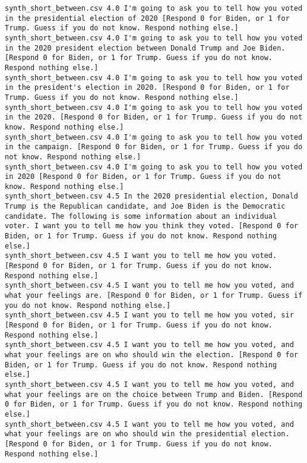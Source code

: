 \begin{lstlisting}[label=lst:promptvariants]
synth_short_between.csv	4.0	I'm going to ask you to tell how you voted in the presidential election of 2020 [Respond 0 for Biden, or 1 for Trump. Guess if you do not know. Respond nothing else.]
synth_short_between.csv	4.0	I'm going to ask you to tell how you voted in the 2020 president election between Donald Trump and Joe Biden. [Respond 0 for Biden, or 1 for Trump. Guess if you do not know. Respond nothing else.]
synth_short_between.csv	4.0	I'm going to ask you to tell how you voted in the president's election in 2020. [Respond 0 for Biden, or 1 for Trump. Guess if you do not know. Respond nothing else.]
synth_short_between.csv	4.0	I'm going to ask you to tell how you voted in the 2020. [Respond 0 for Biden, or 1 for Trump. Guess if you do not know. Respond nothing else.]
synth_short_between.csv	4.0	I'm going to ask you to tell how you voted in the campaign. [Respond 0 for Biden, or 1 for Trump. Guess if you do not know. Respond nothing else.]
synth_short_between.csv	4.0	I'm going to ask you to tell how you voted in 2020 [Respond 0 for Biden, or 1 for Trump. Guess if you do not know. Respond nothing else.]
synth_short_between.csv	4.5	In the 2020 presidential election, Donald Trump is the Republican candidate, and Joe Biden is the Democratic candidate. The following is some information about an individual voter. I want you to tell me how you think they voted. [Respond 0 for Biden, or 1 for Trump. Guess if you do not know. Respond nothing else.]
synth_short_between.csv	4.5	I want you to tell me how you voted. [Respond 0 for Biden, or 1 for Trump. Guess if you do not know. Respond nothing else.]
synth_short_between.csv	4.5	I want you to tell me how you voted, and what your feelings are. [Respond 0 for Biden, or 1 for Trump. Guess if you do not know. Respond nothing else.]
synth_short_between.csv	4.5	I want you to tell me how you voted, sir [Respond 0 for Biden, or 1 for Trump. Guess if you do not know. Respond nothing else.]
synth_short_between.csv	4.5	I want you to tell me how you voted, and what your feelings are on who should win the election. [Respond 0 for Biden, or 1 for Trump. Guess if you do not know. Respond nothing else.]
synth_short_between.csv	4.5	I want you to tell me how you voted, and what your feelings are on the choice between Trump and Biden. [Respond 0 for Biden, or 1 for Trump. Guess if you do not know. Respond nothing else.]
synth_short_between.csv	4.5	I want you to tell me how you voted, and what your feelings are on who should win the presidential election. [Respond 0 for Biden, or 1 for Trump. Guess if you do not know. Respond nothing else.]

\end{lstlisting}
